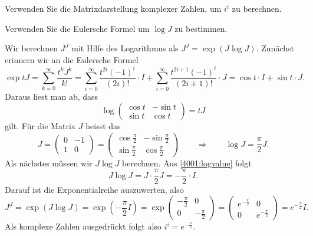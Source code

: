Verwenden Sie die Matrixdarstellung komplexer Zahlen, um $i^i$ zu
berechnen.

\begin{hinweis}
Verwenden Sie die Eulersche Formel um $\log J$ zu bestimmen.
\end{hinweis}

\begin{loesung}
Wir berechnen $J^J$ mit Hilfe des Logarithmus als
$J^J = \exp(J\log J)$.
Zunächst erinnern wir an die Eulersche Formel
\[
\exp tJ
=
\sum_{k=0}^\infty \frac{t^k J^k}{k!}
=
\sum_{i=0}^\infty \frac{t^{2i}(-1)^i}{(2i)!}\cdot I
+
\sum_{i=0}^\infty \frac{t^{2i+1}(-1)^i}{(2i+1)!}\cdot J
=
\cos t\cdot I
+
\sin t\cdot J.
\]
Daraus liest man ab, dass 
\[
\log \begin{pmatrix}
\cos t&-\sin t\\
\sin t& \cos t
\end{pmatrix}
=
tJ
\]
gilt.
Für die Matrix $J$ heisst das
\begin{equation}
J = \begin{pmatrix}
0&-1\\1&0
\end{pmatrix}
=
\begin{pmatrix}
\cos\frac{\pi}2&-\sin\frac{\pi}2\\
\sin\frac{\pi}2& \cos\frac{\pi}2
\end{pmatrix}
\qquad\Rightarrow\qquad
\log J = \frac{\pi}2 J.
\label{4001:logvalue}
\end{equation}
Als nächstes müssen wir $J\log J$ berechnen.
Aus \eqref{4001:logvalue} folgt
\[
J\log J = J\cdot \frac{\pi}2J = - \frac{\pi}2 \cdot I.
\]
Darauf ist die Exponentialreihe auszuwerten, also
\[
J^J
=
\exp (J\log J)
=
\exp(-\frac{\pi}2 I)
=
\exp
\begin{pmatrix}
-\frac{\pi}2&0\\
0&-\frac{\pi}2
\end{pmatrix}
=
\begin{pmatrix}
e^{-\frac{\pi}2}&0\\
0&e^{-\frac{\pi}2}
\end{pmatrix}
=
e^{-\frac{\pi}2} I.
\]
Als komplexe Zahlen ausgedrückt folgt also $i^i = e^{-\frac{\pi}2}$.
\end{loesung}
